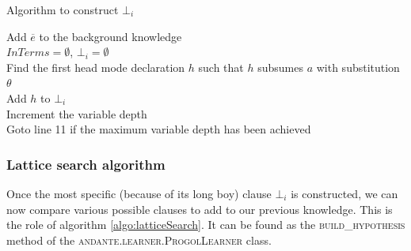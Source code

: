 \documentclass{article}
\begin{document}
\begin{algorithm}[H]
\label{algo:constructboti}
\caption{Algorithm to construct $\bot_i$}
Add $\overline{e}$ to the background knowledge \\
$InTerms = \emptyset$, $\bot_i = \emptyset$ \\
Find the first head mode declaration $h$ such that $h$ subsumes $a$ with 
substitution $\theta$ \\
Add $h$ to $\bot_i$ \\
Increment the variable depth \\
Goto line 11 if the maximum variable depth has been achieved
\end{algorithm}

\subsubsection{Lattice search algorithm} \label{ilp:inductionalgo:latticesearch}

Once the most specific (because of its long boy) clause $\bot_i$ is 
constructed, we can now compare various possible clauses to add to our previous
knowledge. This is the role of algorithm \ref{algo:latticeSearch}. It can be 
found as the \textsc{build\_hypothesis} method of the 
\textsc{andante.learner.ProgolLearner} class.
\end{document}
